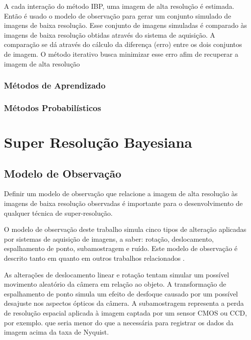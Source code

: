 \documentclass[12pt,openright,oneside,a4paper,english,brazil]{abntex2}
\begin{document}

A cada interação do método IBP, uma imagem de alta resolução é estimada.
Então é usado o modelo de observação para gerar um conjunto simulado de imagens de baixa resolução.
Esse conjunto de imagens simuladas é comparado às imagens de baixa resolução obtidas através do sistema de aquisição.
A comparação se dá através do cálculo da diferença (erro) entre os dois conjuntos de imagem.
O método iterativo busca minimizar esse erro afim de recuperar a imagem de alta resolução \cite{park2003super,reis2014metodo}

\subsection{Métodos de Aprendizado}
\subsection{Métodos Probabilísticos}


\chapter{Super Resolução Bayesiana}
\section{Modelo de Observação}
\label{sec:obsmodel}

Definir um modelo de observação que relacione a imagem de alta resolução às imagens de baixa resolução observadas é importante para o desenvolvimento de qualquer técnica de super-resolução.

O modelo de observação deste trabalho simula cinco tipos de alteração aplicadas por sistemas de aquisição de imagens, a saber: rotação, deslocamento, espalhamento de ponto, subamostragem e ruído.
Este modelo de observação é descrito tanto em \cite{tipping2003bayesian} quanto em outros trabalhos relacionados \cite{pickup2007bayesian, Capel01a}.

As alterações de deslocamento linear e rotação tentam simular um possível movimento aleatório da câmera em relação ao objeto.
A transformação de espalhamento de ponto simula um efeito de desfoque causado por um possível desajuste nos aspectos ópticos da câmera.
A subamostragem representa a perda de resolução espacial aplicada à imagem captada por um sensor CMOS ou CCD, por exemplo.
que seria menor do que a necessária para registrar os dados da imagem acima da taxa de Nyquist.
\end{document}
